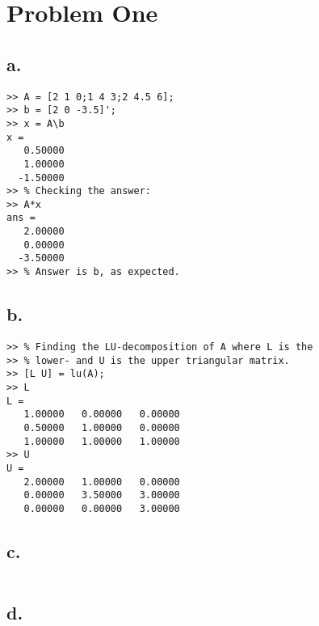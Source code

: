 \documentclass[00-main.tex]{subfiles}
\begin{document}
\section*{Problem One}

\subsection*{a.}

\begin{verbatim}
>> A = [2 1 0;1 4 3;2 4.5 6];
>> b = [2 0 -3.5]';
>> x = A\b
x =
   0.50000
   1.00000
  -1.50000
>> % Checking the answer:
>> A*x
ans =
   2.00000
   0.00000
  -3.50000
>> % Answer is b, as expected.
\end{verbatim}

\subsection*{b.}

\begin{verbatim}
>> % Finding the LU-decomposition of A where L is the
>> % lower- and U is the upper triangular matrix.
>> [L U] = lu(A);
>> L
L =
   1.00000   0.00000   0.00000
   0.50000   1.00000   0.00000
   1.00000   1.00000   1.00000
>> U
U =
   2.00000   1.00000   0.00000
   0.00000   3.50000   3.00000
   0.00000   0.00000   3.00000
\end{verbatim}

\subsection*{c.}

\inputminted[linenos]{matlab_c}{newton.m}

\subsection{d.}

\inputminted[linenos]{matlab_d}{newton.m}


\end{document}
